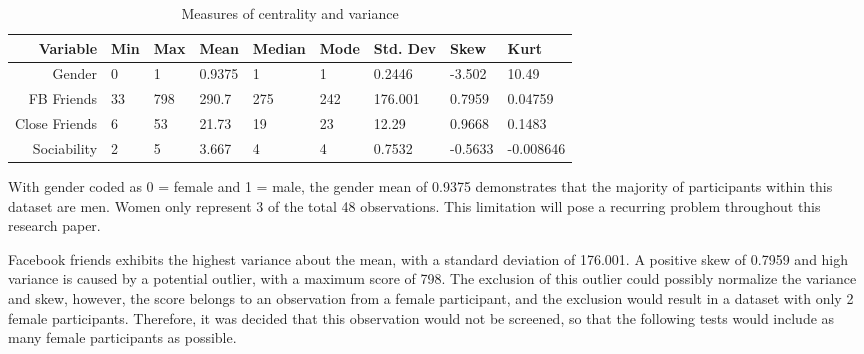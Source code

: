 \begin{table}[H]
\centering
\caption{Measures of centrality and variance}
\begin{tabular}{r|l|l|l|l|l|l|l|l}
Variable      & Min & Max & Mean   & Median & Mode & Std. Dev & Skew    & Kurt      \\ \hline
Gender        & 0   & 1   & 0.9375 & 1      & 1    & 0.2446   & -3.502  & 10.49     \\ \hline
FB Friends    & 33  & 798 & 290.7  & 275    & 242  & 176.001  & 0.7959  & 0.04759   \\ \hline
Close Friends & 6   & 53  & 21.73  & 19     & 23   & 12.29    & 0.9668  & 0.1483    \\ \hline
Sociability   & 2   & 5   & 3.667  & 4      & 4    & 0.7532   & -0.5633 & -0.008646 \\ \hline
\end{tabular}
\end{table}



With gender coded as 0 = female and 1 = male, the gender mean of 0.9375 demonstrates that the majority of participants within this dataset are men. Women only represent 3 of the total 48 observations. This limitation will pose a recurring problem throughout this research paper.


Facebook friends exhibits the highest variance about the mean, with a standard deviation of 176.001. A positive skew of 0.7959 and high variance is caused by a potential outlier, with a maximum score of 798. The exclusion of this outlier could possibly normalize the variance and skew, however, the score belongs to an observation from a female participant, and the exclusion would result in a dataset with only 2 female participants. Therefore, it was decided that this observation would not be screened, so that the following tests would include as many female participants as possible.

